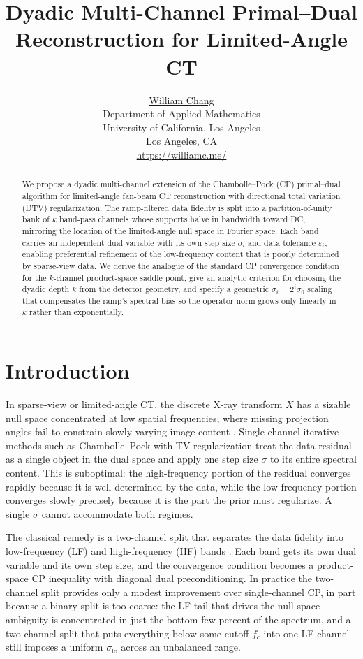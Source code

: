 \documentclass{article}
\title{Dyadic Multi-Channel Primal--Dual Reconstruction for Limited-Angle CT}
\date{}
\author{ \href{https://orcid.org/0000-0003-1700-756X}{William Chang} \\
    Department of Applied Mathematics\\
    University of California, Los Angeles\\
    Los Angeles, CA \\
    \url{https://williamc.me/} \\
    \And
}
\newcommand{\eps}{\varepsilon}
\begin{document}
\maketitle

\begin{abstract}
We propose a dyadic multi-channel extension of the Chambolle--Pock (CP)
primal--dual algorithm for limited-angle fan-beam CT reconstruction with
directional total variation (DTV) regularization. The ramp-filtered data
fidelity is split into a partition-of-unity bank of $k$ band-pass
channels whose supports halve in bandwidth toward DC, mirroring the
location of the limited-angle null space in Fourier space. Each band
carries an independent dual variable with its own step size $\sigma_i$
and data tolerance $\eps_i$, enabling preferential refinement of the
low-frequency content that is poorly determined by sparse-view data.
We derive the analogue of the standard CP convergence condition for the
$k$-channel product-space saddle point, give an analytic criterion for
choosing the dyadic depth $k$ from the detector geometry, and specify a
geometric $\sigma_i = 2^i \sigma_0$ scaling that compensates the
ramp's spectral bias so the operator norm grows only linearly in $k$
rather than exponentially.
\end{abstract}

\section{Introduction}

In sparse-view or limited-angle CT, the discrete X-ray transform $X$
has a sizable null space concentrated at low spatial frequencies, where
missing projection angles fail to constrain slowly-varying image
content \citep{sidky2012}. Single-channel iterative methods such as
Chambolle--Pock with TV regularization \citep{chambolle2011,sidky2012}
treat the data residual as a single object in the dual space and apply
one step size $\sigma$ to its entire spectral content. This is
suboptimal: the high-frequency portion of the residual converges
rapidly because it is well determined by the data, while the
low-frequency portion converges slowly precisely because it is the part
the prior must regularize. A single $\sigma$ cannot accommodate both
regimes.

The classical remedy is a two-channel split that separates the
data fidelity into low-frequency (LF) and high-frequency (HF) bands
\citep{sidky2014}. Each band gets its own dual variable and its own
step size, and the convergence condition becomes a product-space CP
inequality with diagonal dual preconditioning. In practice the two-channel
split provides only a modest improvement over single-channel CP, in
part because a binary split is too coarse: the LF tail that drives the
null-space ambiguity is concentrated in just the bottom few percent of
the spectrum, and a two-channel split that puts everything below some
cutoff $f_c$ into one LF channel still imposes a uniform $\sigma_\text{lo}$
across an unbalanced range.
\end{document}
